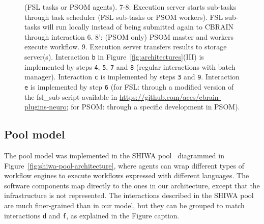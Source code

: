 \documentclass[preprint,3p,twocolumn]{elsarticle}
\begin{document}
{\begin{figure}
{  (FSL tasks or PSOM agents). 7-8: Execution server starts sub-tasks
  through task scheduler (FSL sub-tasks or PSOM workers). FSL sub-tasks will run locally
  instead of being submitted again to CBRAIN through interaction 6. 8':
  (PSOM only) PSOM master and workers execute workflow. 9. Execution
  server transfers results to storage server(s). Interaction
  \texttt{b} in Figure~\ref{fig:architectures}(III) is implemented by steps
  \texttt{4}, \texttt{5}, \texttt{7} and \texttt{8} (regular
  interactions with batch manager). Interaction \texttt{c} is
  implemented by steps \texttt{3} and \texttt{9}. Interaction
  \texttt{e} is implemented by step \texttt{6} (for FSL: through a
  modified version of the fsl\_sub script available in
  \url{https://github.com/aces/cbrain-plugins-neuro}; for PSOM:
  through a specific development in PSOM).}
\label{fig:cbrain-sub-tasking}
\end{figure}

\subsection{Pool model}

The pool model was implemented in the SHIWA pool~\cite{ROGE-13}
diagrammed in Figure~\ref{fig:shiwa-pool-architecture}, where agents
can wrap different types of workflow engines to execute workflows
expressed with different languages. The software components map
directly to the ones in our architecture, except that the
infrastructure is not represented. The interactions described in the
SHIWA pool are much finer-grained than in our model, but they can be
grouped to match interactions \texttt{d} and \texttt{f}, as explained
in the Figure caption.

}
\end{document}
